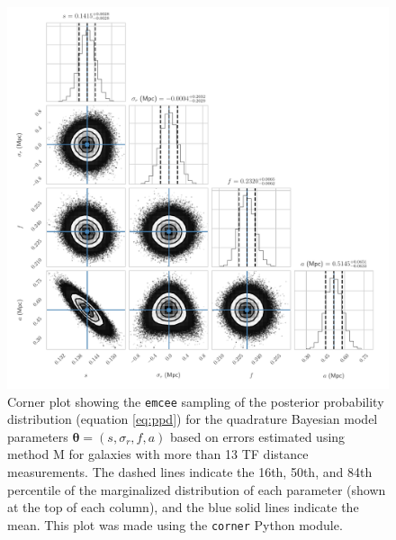 \documentclass[a4paper,fleqn,usenatbib]{mnras}
\begin{document}
\begin{figure}
	\includegraphics[scale=0.69]{cornerq2}
    \caption{Corner plot showing the \texttt{emcee} sampling of the posterior probability distribution (equation \ref{eq:ppd}) for the quadrature Bayesian model parameters $\pmb{\theta}=(s,\sigma_r,f,a)$ based on errors estimated using method M for galaxies with more than 13 TF distance measurements. The dashed lines indicate the 16th, 50th, and 84th percentile of the marginalized distribution of each parameter (shown at the top of each column), and the blue solid lines indicate the mean. This plot was made using the \texttt{corner} Python module.}
    \label{fig:cornerq2}
\end{figure}
\end{document}
